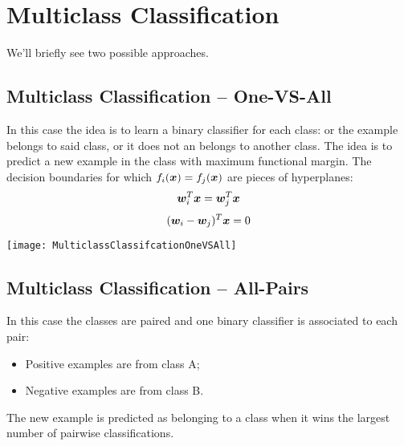 \section{Multiclass Classification}
We'll briefly see two possible approaches.
%
%
\subsection{Multiclass Classification -- One-VS-All}
In this case the idea is to learn a binary classifier for each class: or the example belongs to said class, or it does not an belongs to another class. \newline
The idea is to predict a new example in the class with maximum functional margin. \newline
The decision boundaries for which $f_i(\bm{x})=f_j(\bm{x})$ are pieces of hyperplanes:
\[\bm{w}_i^T\bm{x}=\bm{w}_j^T\bm{x}\]
\[(\bm{w}_i-\bm{w}_j)^T\bm{x}=0\]
\begin{center}
  \texttt{[image: MulticlassClassifcationOneVSAll]}
\end{center}
%
%
\subsection{Multiclass Classification -- All-Pairs}
In this case the classes are paired and one binary classifier is associated to each pair:
\begin{itemize}
  \item Positive examples are from class A;
  \item Negative examples are from class B.
\end{itemize}
The new example is predicted as belonging to a class when it wins the largest number of pairwise classifications. 
%
%
%
